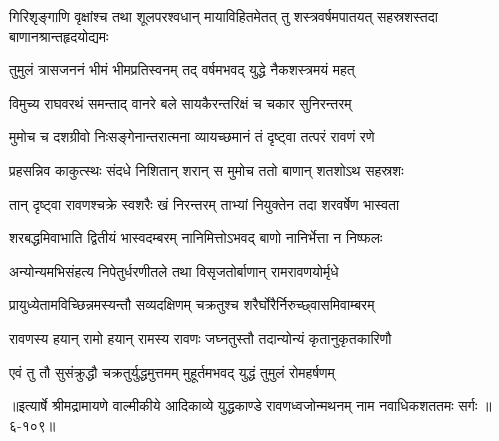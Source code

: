 \threelineshloka
{गिरिशृङ्गाणि वृक्षांश्च तथा शूलपरश्वधान्}
{मायाविहितमेतत् तु शस्त्रवर्षमपातयत्}
{सहस्रशस्तदा बाणानश्रान्तहृदयोद्यमः} %

\twolineshloka
{तुमुलं त्रासजननं भीमं भीमप्रतिस्वनम्}
{तद् वर्षमभवद् युद्धे नैकशस्त्रमयं महत्} %

\twolineshloka
{विमुच्य राघवरथं समन्ताद् वानरे बले}
{सायकैरन्तरिक्षं च चकार सुनिरन्तरम्} %

\twolineshloka
{मुमोच च दशग्रीवो निःसङ्गेनान्तरात्मना}
{व्यायच्छमानं तं दृष्ट्वा तत्परं रावणं रणे} %

\twolineshloka
{प्रहसन्निव काकुत्स्थः संदधे निशितान् शरान्}
{स मुमोच ततो बाणान् शतशोऽथ सहस्रशः} %

\twolineshloka
{तान् दृष्ट्वा रावणश्चक्रे स्वशरैः खं निरन्तरम्}
{ताभ्यां नियुक्तेन तदा शरवर्षेण भास्वता} %

\twolineshloka
{शरबद्धमिवाभाति द्वितीयं भास्वदम्बरम्}
{नानिमित्तोऽभवद् बाणो नानिर्भेत्ता न निष्फलः} %

\twolineshloka
{अन्योन्यमभिसंहत्य निपेतुर्धरणीतले}
{तथा विसृजतोर्बाणान् रामरावणयोर्मृधे} %

\twolineshloka
{प्रायुध्येतामविच्छिन्नमस्यन्तौ सव्यदक्षिणम्}
{चक्रतुश्च शरैर्घोरैर्निरुच्छ्वासमिवाम्बरम्} %

\twolineshloka
{रावणस्य हयान् रामो हयान् रामस्य रावणः}
{जघ्नतुस्तौ तदान्योन्यं कृतानुकृतकारिणौ} %

\twolineshloka
{एवं तु तौ सुसंक्रुद्धौ चक्रतुर्युद्धमुत्तमम्}
{मुहूर्तमभवद् युद्धं तुमुलं रोमहर्षणम्} %


॥इत्यार्षे श्रीमद्रामायणे वाल्मीकीये आदिकाव्ये युद्धकाण्डे रावणध्वजोन्मथनम् नाम नवाधिकशततमः सर्गः ॥६-१०९॥
